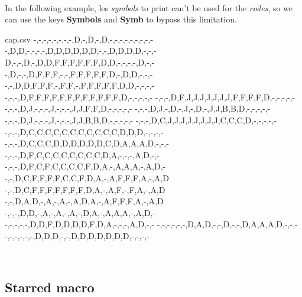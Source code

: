 \documentclass{article}
\newcommand\Cle[1]{{\bfseries\sffamily\textlangle #1\textrangle}}
\begin{document}
\begin{PresentationCode}{}
~~
~~
\end{PresentationCode}

\pagebreak

In the following example, les \textit{symbols} to print can't be used for the \textit{codes}, so we can use the keys \Cle{Symbols} and \Cle{Symb} to bypass this limitation.

\begin{PresentationCode}{}

\begin{filecontents*}[overwrite]{cap.csv}
	-,-,-,-,-,-,-,-,D,-,D,-,D,-,-,-,-,-,-,-,-,-
	-,D,D,-,-,-,-,D,D,D,D,D,D,-,-,D,D,D,D,-,-,-
	D,-,-,D,-,D,D,F,F,F,F,F,F,D,D,-,-,-,-,D,-,-
	-,D,-,-,D,F,F,F,-,-,F,F,F,F,F,D,-,D,D,-,-,-
	-,-,D,D,F,F,F,-,F,F,-,F,F,F,F,F,D,D,-,-,-,-
	-,-,-,D,F,F,F,F,F,F,F,F,F,F,F,F,D,-,-,-,-,-
	-,-,-,D,F,J,J,J,J,J,J,J,F,F,F,F,D,-,-,-,-,-
	-,-,-,D,J,-,-,-,J,-,-,-,J,J,F,F,D,-,-,-,-,-
	-,-,-,D,J,-,D,-,J,-,D,-,J,J,B,B,D,-,-,-,-,-
	-,-,-,D,J,-,-,-,J,-,-,-,J,J,B,B,D,-,-,-,-,-
	-,-,-,D,C,J,J,J,J,J,J,J,J,C,C,C,D,-,-,-,-,-
	-,-,-,D,C,C,C,C,C,C,C,C,C,C,C,D,D,D,-,-,-,-
	-,-,-,D,C,C,C,D,D,D,D,D,D,C,D,A,A,A,D,-,-,-
	-,-,-,D,F,C,C,C,C,C,C,C,C,D,A,-,-,-,A,D,-,-
	-,-,-,D,F,C,F,C,C,C,C,F,D,A,-,A,A,A,-,A,D,-
	-,-,D,C,F,F,F,F,C,C,F,D,A,-,A,F,F,F,A,-,A,D
	-,-,D,C,F,F,F,F,F,F,F,D,A,-,A,F,-,F,A,-,A,D
	-,-,D,A,D,-,A,-,A,-,A,D,A,-,A,F,F,F,A,-,A,D
	-,-,-,D,D,-,A,-,A,-,A,-,D,A,-,A,A,A,-,A,D,-
	-,-,-,-,-,D,D,F,D,D,D,D,F,D,A,-,-,-,A,D,-,-
	-,-,-,-,-,-,D,A,D,-,-,D,-,-,D,A,A,A,D,-,-,-
	-,-,-,-,-,-,D,D,D,-,-,D,D,D,D,D,D,D,-,-,-,-
\end{filecontents*}

~~
\end{PresentationCode}

\pagebreak

\subsection{Starred macro}
\end{document}
